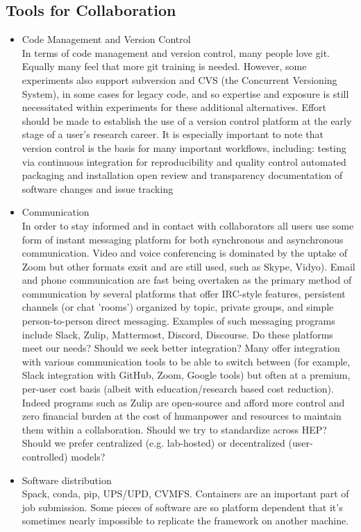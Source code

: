 \subsection{Tools for Collaboration}

\begin{itemize} 
  \item Code Management and Version Control\\
In terms of code management and version control, many people love git. Equally many feel that more git training is needed. However, some experiments also support subversion and CVS (the Concurrent Versioning System), in some cases for legacy code, and so expertise and exposure is still necessitated
within experiments for these additional alternatives. Effort should be made to establish the use of a version control platform at the early stage of a user's research career. It is especially important to note that version control is the basis for many important workflows, including:
       \subitem testing via continuous integration for reproducibility and quality control
       \subitem automated packaging and installation
       \subitem open review and transparency
       \subitem documentation of software changes and issue tracking       
  \item Communication\\
In order to stay informed and in contact with collaborators all users use some form of instant messaging platform for both synchronous and asynchronous communication. Video and voice conferencing is dominated by the uptake of Zoom but other formats exsit and are still used, such as Skype, Vidyo). Email and phone communication are fast being overtaken as the primary method of communication by several platforms that offer IRC-style features, persistent channels (or chat 'rooms') organized by topic, private groups, and simple person-to-person direct messaging. Examples of such messaging programs include Slack, Zulip, Mattermost, Discord, Discourse. 
Do these platforms meet our needs? Should we seek better integration? Many offer integration with various communication tools to be able to switch between (for example, Slack integration with GitHub, Zoom, Google tools) but often at a premium, per-user cost basis (albeit with education/research based cost reduction). Indeed programs such as Zulip are open-source and afford more control and zero financial burden at the cost of humanpower and resources to maintain them within a collaboration.
Should we try to standardize across HEP?
Should we prefer centralized (e.g. lab-hosted) or decentralized (user-controlled) models?
  \item Software distribution\\
Spack, conda, pip, UPS/UPD, CVMFS.
Containers are an important part of job submission.
Some pieces of software are so platform dependent that it's sometimes nearly impossible to replicate the framework on another machine.


\end{itemize}
